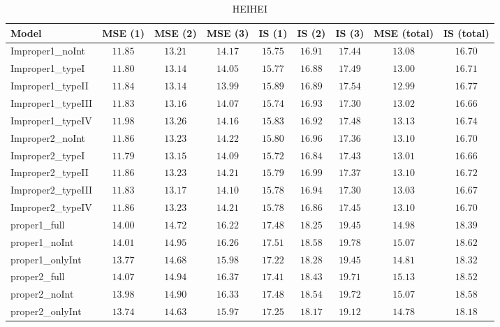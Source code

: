 \begin{table}

\caption{\label{tab:model-choice-sc3}HEIHEI}
\centering
\begin{tabular}{lcccccccc}
\hline
Model  & MSE (1) & MSE (2) & MSE (3) & IS (1) & IS (2) & IS (3) & MSE (total) & \multicolumn{1}{c}{IS (total)} \\ 
\hline
Improper1_noInt  & $11.85$ & $13.21$ & $14.17$ & $15.75$ & $16.91$ & $17.44$ & $13.08$ & $16.70$ \\
Improper1_typeI  & $11.80$ & $13.14$ & $14.05$ & $15.77$ & $16.88$ & $17.49$ & $13.00$ & $16.71$ \\
Improper1_typeII  & $11.84$ & $13.14$ & $13.99$ & $15.89$ & $16.89$ & $17.54$ & $12.99$ & $16.77$ \\
Improper1_typeIII  & $11.83$ & $13.16$ & $14.07$ & $15.74$ & $16.93$ & $17.30$ & $13.02$ & $16.66$ \\
Improper1_typeIV  & $11.98$ & $13.26$ & $14.16$ & $15.83$ & $16.92$ & $17.48$ & $13.13$ & $16.74$ \\
Improper2_noInt  & $11.86$ & $13.23$ & $14.22$ & $15.80$ & $16.96$ & $17.36$ & $13.10$ & $16.70$ \\
Improper2_typeI  & $11.79$ & $13.15$ & $14.09$ & $15.72$ & $16.84$ & $17.43$ & $13.01$ & $16.66$ \\
Improper2_typeII  & $11.86$ & $13.23$ & $14.21$ & $15.79$ & $16.99$ & $17.37$ & $13.10$ & $16.72$ \\
Improper2_typeIII  & $11.83$ & $13.17$ & $14.10$ & $15.78$ & $16.94$ & $17.30$ & $13.03$ & $16.67$ \\
Improper2_typeIV  & $11.86$ & $13.23$ & $14.21$ & $15.78$ & $16.86$ & $17.45$ & $13.10$ & $16.70$ \\
proper1_full  & $14.00$ & $14.72$ & $16.22$ & $17.48$ & $18.25$ & $19.45$ & $14.98$ & $18.39$ \\
proper1_noInt  & $14.01$ & $14.95$ & $16.26$ & $17.51$ & $18.58$ & $19.78$ & $15.07$ & $18.62$ \\
proper1_onlyInt  & $13.77$ & $14.68$ & $15.98$ & $17.22$ & $18.28$ & $19.45$ & $14.81$ & $18.32$ \\
proper2_full  & $14.07$ & $14.94$ & $16.37$ & $17.41$ & $18.43$ & $19.71$ & $15.13$ & $18.52$ \\
proper2_noInt  & $13.98$ & $14.90$ & $16.33$ & $17.48$ & $18.54$ & $19.72$ & $15.07$ & $18.58$ \\
proper2_onlyInt  & $13.74$ & $14.63$ & $15.97$ & $17.25$ & $18.17$ & $19.12$ & $14.78$ & $18.18$ \\
\hline 
\end{tabular}


\end{table}